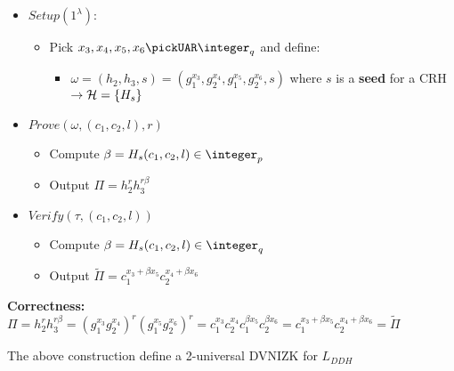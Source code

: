 \begin{itemize}
    \item $Setup(1^\lambda)$: \begin{itemize}
        \item Pick $x_3,x_4,x_5,x_6 \pickUAR \integer_q$ and define:
        \begin{itemize}
            \item $\omega=(h_2,h_3,s)=(g_1^{x_3},g_2^{x_4},g_1^{x_5},g_2^{x_6},s)$ where $s$ is a \textbf{seed} for a CRH$\rightarrow \mathcal{H}=\{H_s\}$ %
        \end{itemize}
    \end{itemize}
    \item $Prove(\omega, (c_1,c_2,l), r)$ \begin{itemize}
        \item Compute $\beta=H_s(c_1,c_2,l)\in \integer_p$
        \item Output $\Pi=h_2^rh_3^{r\beta}$
    \end{itemize}
    \item $Verify(\tau, (c_1,c_2,l))$\begin{itemize}
        \item Compute $\beta=H_s(c_1,c_2,l)\in \integer_q$
        \item Output $\widetilde{\Pi}=c_1^{x_3+\beta x_5}c_2^{x_4+\beta x_6}$
    \end{itemize}
\end{itemize}

\noindent\textbf{Correctness:}\\ $\Pi=h_2^rh_3^{r\beta}=(g_1^{x_3}g_2^{x_4})^r(g_1^{x_5}g_2^{x_6})^r=c_1^{x_3}c_2^{x_4}c_1^{\beta x_5}c_2^{\beta x_6}=c_1^{x_3+\beta x_5}c_2^{x_4+\beta x_6}=\widetilde{\Pi}$

\begin{theorem}
    The above construction define a 2-universal DVNIZK for $L_{DDH}$    
\end{theorem}

